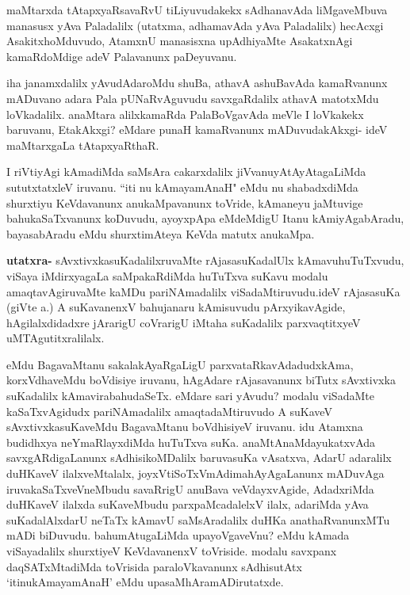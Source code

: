 \begin{artha}
maMtarxda tAtapxyaR\ndash  savaRvU tiLiyuvudakekx sAdhanavAda liMgaveMbuva manasusx yAva Paladalilx (utatxma, adhamavAda yAva Paladalilx) hecAcxgi AsakitxhoMduvudo, AtamxnU manasisxna upAdhiyaMte AsakatxnAgi kamaRdoMdige adeV Palavanunx paDeyuvanu.

iha janamxdalilx yAvudAdaroMdu shuBa, athavA ashuBavAda kamaRvanunx mADuvano adara Pala pUNaRvAguvudu savxgaRdalilx athavA matotxMdu loVkadalilx. anaMtara alilxkamaRda PalaBoVgavAda meVle I loVkakekx baruvanu, EtakAkxgi? eMdare punaH kamaRvanunx mADuvudakAkxgi- ideV maMtarxgaLa tAtapxyaRthaR.
\end{artha}

\begin{artha}
I riVtiyAgi kAmadiMda saMsAra cakarxdalilx jiVvanu\break yAtAyAtagaLiMda sututxtatxleV iruvanu. ``iti nu kAmayamAnaH" eMdu nu shabadxdiMda shurxtiyu KeVdavanunx anukaMpavanunx toVride, kAmaneyu jaMtuvige bahukaSaTxvanunx koDuvudu, ayoyxpApa eMdeMdigU Itanu kAmiyAgabAradu, bayasabAradu eMdu shurxtimAteya KeVda matutx anukaMpa.
\end{artha}


\begin{artha}
\textbf{utatxra-} sAvxtivxkasuKadalilxruvaMte rAjasasuKadalUlx kAmavu\break huTuTxvudu, viSaya iMdirxyagaLa saMpakaRdiMda huTuTxva suKavu modalu amaqtavAgiruvaMte kaMDu pariNAmadalilx viSadaMtiruvudu.ideV rAjasasuKa (giVte a.) A suKavanenxV bahujanaru kAmisuvudu pArxyikavAgide, hAgilalxdidadxre jArarigU coVrarigU iMtaha suKadalilx parxvaqtitxyeV uMTAgutitxralilalx. 
\end{artha}

\begin{artha}
eMdu BagavaMtanu sakalakAyaRgaLigU parxvataRkavAdadudx\break kAma, korxVdhaveMdu boVdisiye iruvanu, hAgAdare rAjasavanunx biTutx sAvxtivxka suKadalilx kAmavirabahudaSeTx. eMdare sari yAvudu? modalu viSadaMte kaSaTxvAgidudx pariNAmadalilx amaqtadaMtiruvudo A suKaveV sAvxtivxkasuKaveMdu BagavaMtanu boVdhisiyeV iruvanu. idu Atamxna budidhxya neYmaRlayxdiMda huTuTxva suKa. anaMtAnaMdayukatxvAda savxgARdigaLanunx sAdhisikoMDalilx baruvasuKa vAsatxva, AdarU adaralilx duHKaveV ilalxveMtalalx, joyxVtiSoTxVmAdi\break mahAyAgaLanunx mADuvAga iruvakaSaTxveVneMbudu savaRrigU anuBava veVdayxvAgide, AdadxriMda duHKaveV ilalxda suKaveMbudu parxpaMcadalelxV ilalx, adariMda yAva suKadalAlxdarU neTaTx kAmavU saMsAradalilx duHKa anathaRvanunxMTu mADi biDuvudu. bahumAtugaLiMda upayoVgaveVnu? eMdu kAmada viSayadalilx shurxtiyeV KeVdavanenxV toVriside. modalu savxpanx daqSATxMtadiMda toVrisida paraloVkavanunx sAdhisutAtx `itinukAmayamAnaH' eMdu upasaMhAramADirutatxde.
\end{artha}

